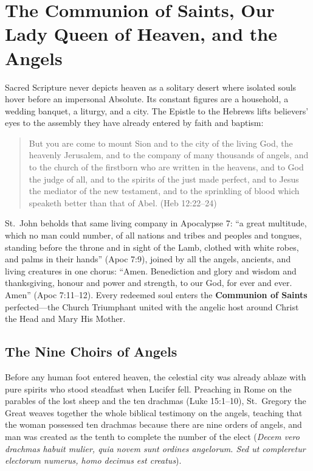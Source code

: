 \section{The Communion of Saints, Our Lady Queen of Heaven, and the Angels}

Sacred Scripture never depicts heaven as a solitary desert where isolated souls hover before an impersonal Absolute. Its constant figures are a household, a wedding banquet, a liturgy, and a city. The Epistle to the Hebrews lifts believers' eyes to the assembly they have already entered by faith and baptism:

\begin{quote}
But you are come to mount Sion and to the city of the living God, the heavenly Jerusalem, and to the company of many thousands of angels, and to the church of the firstborn who are written in the heavens, and to God the judge of all, and to the spirits of the just made perfect, and to Jesus the mediator of the new testament, and to the sprinkling of blood which speaketh better than that of Abel. (Heb 12:22--24)
\end{quote}

St.\ John beholds that same living company in Apocalypse 7: ``a great multitude, which no man could number, of all nations and tribes and peoples and tongues, standing before the throne and in sight of the Lamb, clothed with white robes, and palms in their hands'' (Apoc 7:9), joined by all the angels, ancients, and living creatures in one chorus: ``Amen. Benediction and glory and wisdom and thanksgiving, honour and power and strength, to our God, for ever and ever. Amen'' (Apoc 7:11--12). Every redeemed soul enters the \textbf{Communion of Saints} perfected---the Church Triumphant united with the angelic host around Christ the Head and Mary His Mother.

\subsection*{The Nine Choirs of Angels}

Before any human foot entered heaven, the celestial city was already ablaze with pure spirits who stood steadfast when Lucifer fell. Preaching in Rome on the parables of the lost sheep and the ten drachmas (Luke 15:1--10), St.\ Gregory the Great weaves together the whole biblical testimony on the angels, teaching that the woman possessed ten drachmas because there are nine orders of angels, and man was created as the tenth to complete the number of the elect (\textit{Decem vero drachmas habuit mulier, quia novem sunt ordines angelorum. Sed ut compleretur electorum numerus, homo decimus est creatus}).

